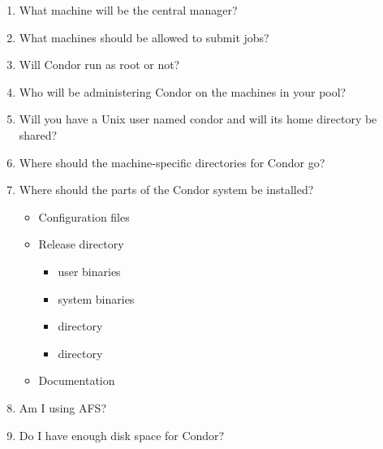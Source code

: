 \begin{enumerate}
\item What machine will be the central manager?
\item What machines should be allowed to submit jobs?
\item Will Condor run as root or not?
\item Who will be administering Condor on the machines in your pool?
\item Will you have a Unix user named condor and will its home directory be
   shared? 
\item Where should the machine-specific directories for Condor go?
\item Where should the parts of the Condor system be installed? 
	\begin{itemize}
	\item Configuration files
	\item Release directory
		\begin{itemize}
		\item user binaries
		\item system binaries 
		\item {} directory
	  	\item {} directory
		\end{itemize}
	\item Documentation
	\end{itemize}
\item Am I using AFS?
\item Do I have enough disk space for Condor?
\end{enumerate}

